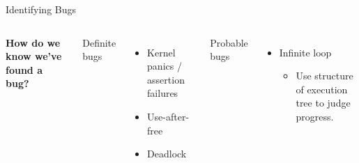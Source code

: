 \documentclass[xcolor=dvipsnames]{beamer}
\begin{document}
\begin{frame}[fragile]{Identifying Bugs}
	\begin{columns}[l]
		\textbf{How do we know we've found a bug?}
		\linegap

		Definite bugs
		\begin{itemize}
			\item Kernel panics / assertion failures
			\item Use-after-free
			\item Deadlock
		\end{itemize}
		Probable bugs
		\begin{itemize}
			\item Infinite loop
			\begin{itemize}
				\item Use structure of execution tree to judge progress.
			\end{itemize}
		\end{itemize}

\end{columns}
\end{frame}
\end{document}
